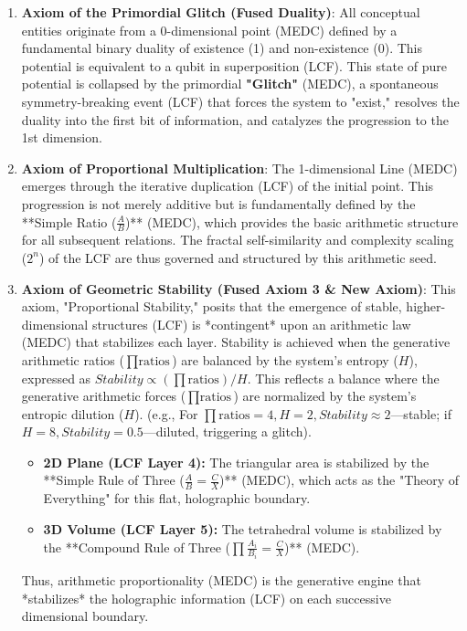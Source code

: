 \documentclass[11pt, a4paper]{article}
\begin{document}
		\begin{enumerate}
			
			\item \textbf{Axiom of the Primordial Glitch (Fused Duality)}:
			All conceptual entities originate from a 0-dimensional point (MEDC) defined by a fundamental binary duality of existence (1) and non-existence (0). This potential is equivalent to a qubit in superposition (LCF). This state of pure potential is collapsed by the primordial \textbf{"Glitch"} (MEDC), a spontaneous symmetry-breaking event (LCF) that forces the system to "exist," resolves the duality into the first bit of information, and catalyzes the progression to the 1st dimension.
			
			\item \textbf{Axiom of Proportional Multiplication}:
			The 1-dimensional Line (MEDC) emerges through the iterative duplication (LCF) of the initial point. This progression is not merely additive but is fundamentally defined by the **Simple Ratio ($\frac{A}{B}$)** (MEDC), which provides the basic arithmetic structure for all subsequent relations. The fractal self-similarity and complexity scaling ($2^n$) of the LCF are thus governed and structured by this arithmetic seed.
			
			\item \textbf{Axiom of Geometric Stability (Fused Axiom 3 \& New Axiom)}:
			This axiom, "Proportional Stability," posits that the emergence of stable, higher-dimensional structures (LCF) is *contingent* upon an arithmetic law (MEDC) that stabilizes each layer. Stability is achieved when the generative arithmetic ratios ($\prod \text{ratios}$) are balanced by the system's entropy ($H$), expressed as $Stability \propto (\prod \text{ratios}) / H$. This reflects a balance where the generative arithmetic forces ($\prod \text{ratios}$) are normalized by the system's entropic dilution ($H$). (e.g., For $\prod \text{ratios}=4, H=2, Stability \approx 2$—stable; if $H=8, Stability=0.5$—diluted, triggering a glitch).
			{\sloppy
				\begin{itemize}
					\item \textbf{2D Plane (LCF Layer 4):} The triangular area is stabilized by the **Simple Rule of Three ($\frac{A}{B} = \frac{C}{X}$)** (MEDC), which acts as the "Theory of Everything" for this flat, holographic boundary.
					\item \textbf{3D Volume (LCF Layer 5):} The tetrahedral volume is stabilized by the **Compound Rule of Three ($\prod \frac{A_i}{B_i} = \frac{C}{X}$)** (MEDC).
				\end{itemize}
			}
			Thus, arithmetic proportionality (MEDC) is the generative engine that *stabilizes* the holographic information (LCF) on each successive dimensional boundary.
			

\end{enumerate}
\end{document}
